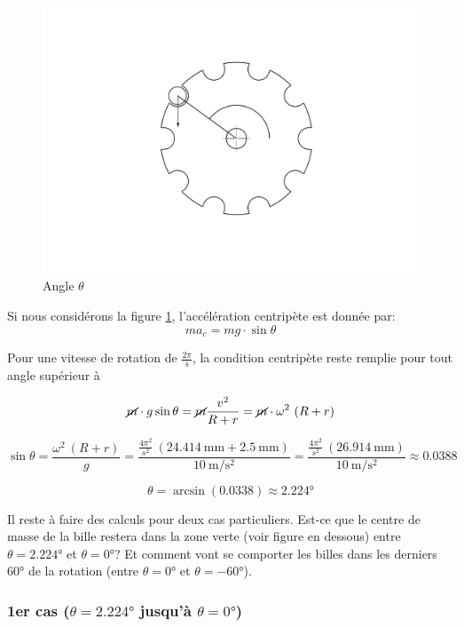 \begin{figure}
    \centering
    \includegraphics[width=\textwidth]{Graphics/Dessins_justification_Leon/JUST_ANGLE.pdf}
    \caption{Angle $\theta$}
    \label{fig:4.1}
\end{figure}

Si nous considérons la figure \ref{fig:4.1}, l'accélération centripète est donnée par:
\[ma_{c} = mg \cdot \sin{\theta}\]


Pour une vitesse de rotation de \(\frac{2 \pi}{s}\), la condition centripète reste remplie pour tout angle supérieur à 

\[\cancel{m} \cdot g \sin{\theta} = \cancel{m} \frac{v^{2}}{R + r} = \cancel{m} \cdot \omega^{2} \ (R +r)\]

\[\sin{\theta} = \frac{\omega^{2} \ (R + r)}{g} = \frac{\frac{4 \pi^{2}}{s^{2}}\ (\SI{24.414}{\milli\metre} + \SI{2.5}{\milli\metre})}{\SI{10}{\m\per\s\squared}} = \frac{\frac{4 \pi^{2}}{s^{2}} \ (\SI{26.914}{\milli\metre})}{\SI{10}{\m\per\s\squared}} \approx 0.0388\]

\[\theta = \arcsin(0.0338) \approx \ang{2.224}\]

Il reste à faire des calculs pour deux cas particuliers. Est-ce que le centre de masse de la bille restera dans la zone verte (voir figure en dessous) entre \(\theta = \ang{2.224}\) et \(\theta = \ang{0}\)? Et comment vont se comporter les billes dans les derniers \ang{60} de la rotation (entre \(\theta = \ang{0}\) et \(\theta = \ang{-60}\)).

\subsubsection{1er cas ($\theta = \ang{2.224}$ jusqu'à $\theta = \ang{0}$)}

